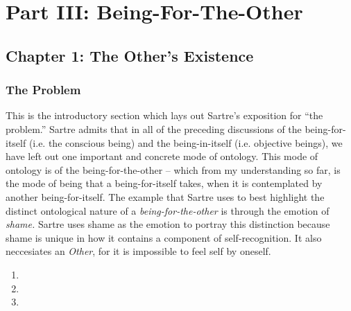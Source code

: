 \chapter{Part III: Being-For-The-Other}

\section{Chapter 1: The Other's Existence}

\subsection{The Problem}

This is the introductory section \autocite[307 -- 309]{sartre} which lays out Sartre's exposition for \enquote{the problem.} Sartre admits that in all of the preceding discussions of the being-for-itself (i.e. the conscious being) and the being-in-itself (i.e. objective beings), we have left out one important and concrete mode of ontology. This mode of ontology is of the being-for-the-other -- which from my understanding so far, is the mode of being that a being-for-itself takes, when it is contemplated by another being-for-itself. The example that Sartre uses to best highlight the distinct ontological nature of a \emph{being-for-the-other} is through the emotion of \emph{shame.} Sartre uses shame as the emotion to portray this distinction because shame is unique in how it contains a component of self-recognition. It also neccesiates an \emph{Other}, for it is impossible to feel self by oneself. 

\begin{enumerate}
  \item {}
  \item {}
  \item {}
\end{enumerate}

